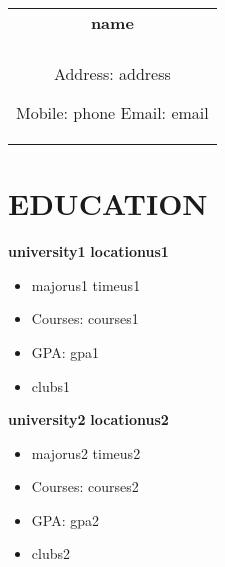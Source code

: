 \documentclass[a4paper,8pt]{article}
\begin{document}
    \pagestyle{empty}
    
    
    \begin{tabularx}{\linewidth}{@{} C @{}}
    \Huge\textbf {{name}} \\[6pt]
    \\
    Address: {{address}}
    
    Mobile: {{phone}}
    Email: {{email}}
    \end{tabularx}
    
    \section{EDUCATION}
    \textbf {{university1}} \hfill \textbf {{locationus1}} \\[-3ex]
    \begin{itemize}[label={\large\textbullet}, left=0pt, itemsep=0.5ex, parsep=0.5ex]
        \item {{majorus1}} \hfill {{timeus1}} \\[-3ex]
    \end{itemize}
    \begin{itemize}[label=$\circ$,itemsep=0.5ex,parsep=0.5ex]
        \item Courses: {{courses1}}
        \item GPA: {{gpa1}}
        \item {{clubs1}}
    \end{itemize}
    
    \textbf {{university2}} \hfill \textbf {{locationus2}} \\[-3ex]
    \begin{itemize}[label={\large\textbullet}, left=0pt, itemsep=0.5ex, parsep=0.5ex]
        \item {{majorus2}} \hfill  {{timeus2}} \\[-3ex]
    \end{itemize}
    \begin{itemize}[label=$\circ$,itemsep=0.5ex,parsep=0.5ex]
        \item Courses: {{courses2}}
        \item GPA: {{gpa2}}
        \item {{clubs2}}
    \end{itemize}
    
\end{document}
